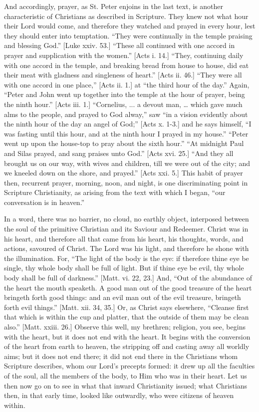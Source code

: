 And accordingly, prayer, as St. Peter enjoins in the last text, is
another characteristic of Christians as described in Scripture. They
knew not what hour their Lord would come, and therefore they watched
and prayed in every hour, lest they should enter into temptation.
``They were continually in the temple praising and blessing
God.'' [Luke xxiv. 53.] ``These all continued with one accord
in prayer and supplication with the women.'' [Acts i. 14.]
``They, continuing daily with one accord in the temple, and
breaking bread from house to house, did eat their meat with gladness
and singleness of heart.'' [Acts ii. 46.] ``They were all with
one accord in one place,'' [Acts ii. 1.] at ``the third hour
of the day.'' Again, ``Peter and John went up together into
the temple at the hour of prayer, being the ninth hour.'' [Acts
iii. 1.] ``Cornelius, ... a devout man, … which gave much alms
to the people, and prayed to God alway,'' saw ``in a vision
evidently about the ninth hour of the day an angel of God;'' [Acts
x. 1-3.] and he says himself, ``I was fasting until this hour, and
at the ninth hour I prayed in my house.'' ``Peter went up upon
the house-top to pray about the sixth hour.'' ``At midnight
Paul and Silas prayed, and sang praises unto God.'' [Acts xvi.
25.] ``And they all brought us on our way, with wives and
children, till we were out of the city; and we kneeled down on the
shore, and prayed.'' [Acts xxi. 5.] This habit of prayer then,
recurrent prayer, morning, noon, and night, is one discriminating
point in Scripture Christianity, as arising from the text with which I
began, ``our conversation is in heaven.''

In a word, there was no barrier, no cloud, no earthly object,
interposed between the soul of the primitive Christian and its Saviour
and Redeemer. Christ was in his heart, and therefore all that came
from his heart, his thoughts, words, and actions, savoured of Christ.
The Lord was his light, and therefore he shone with the illumination.
For, ``The light of the body is the eye: if therefore thine eye be
single, thy whole body shall be full of light. But if thine eye be
evil, thy whole body shall be full of darkness.'' [Matt. vi. 22,
23.] And, ``Out of the abundance of the heart the mouth speaketh.
A good man out of the good treasure of the heart bringeth forth good
things: and an evil man out of the evil treasure, bringeth forth evil
things.'' [Matt. xii. 34, 35.] Or, as Christ says elsewhere,
``Cleanse first that which is within the cup and platter, that the
outside of them may be clean also.'' [Matt. xxiii. 26.] Observe
this well, my brethren; religion, you see, begins with the heart, but
it does not end with the heart. It begins with the conversion of the
heart from earth to heaven, the stripping off and casting away all
worldly aims; but it does not end there; it did not end there in the
Christians whom Scripture describes, whom our Lord's precepts formed:
it drew up all the faculties of the soul, all the members of the body,
to Him who was in their heart. Let us then now go on to see in what
that inward Christianity issued; what Christians then, in that early
time, looked like outwardly, who were citizens of heaven within.


